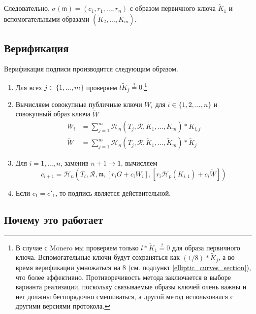 Следовательно, \(\sigma(\mathfrak{m}) = (c_1, r_1, ..., r_n) \) с образом первичного ключа $\tilde{K}_1$ и вспомогательными образами $(\tilde{K}_2,...,\tilde{K}_{m})$.


\subsection*{Верификация}

Верификация подписи производится следующим образом.

\begin{enumerate}
    \item Для всех $j \in \{1,...,m\}$ проверяем $l \tilde{K}_j \stackrel{?}{=} 0$.\footnote{В случае с Monero мы проверяем только $l*\tilde{K}_1 \stackrel{?}{=} 0$ для образа первичного ключа. Вспомогательные ключи будут сохраняться как $(1/8)*\tilde{K}_j$, а во время верификации умножаться на 8 (см. подпункт \ref{elliptic_curves_section}), что более эффективно. Противоречивость метода заключается в выборе варианта реализации, поскольку связываемые образы ключей очень важны и нег должны беспорядочно смешиваться, а другой метод использовался с другими версиями протокола.}

    \item Вычисляем совокупные публичные ключи $W_i$ для \(i \in \{1, 2, ..., n\}\) и совокупный образ ключа $\tilde{W}$\vspace{.175cm}
    \begin{align*}
    W_i &= \sum^{m}_{j=1} \mathcal{H}_n(T_j, \mathcal{R}, \tilde{K}_1,...,\tilde{K}_{m})*K_{i,j}\\
    \tilde{W} &= \sum^{m}_{j=1} \mathcal{H}_n(T_j, \mathcal{R}, \tilde{K}_1,...,\tilde{K}_{m})*\tilde{K}_j
    \end{align*}{}

	\item Для \(i = 1, ..., n\), заменив \(n + 1 \rightarrow 1\), вычисляем\vspace{.175cm}
	\[c_{i+1} = \mathcal{H}_n(T_c, \mathcal{R}, \mathfrak{m}, [r_i G + c_i W_i], [r_{i} \mathcal{H}_p(K_{i,1}) + c_i \tilde{W}])\]

	\item Если \(c_1 = c'_1\), то подпись является действительной.
\end{enumerate}


\subsection*{Почему это работает}

